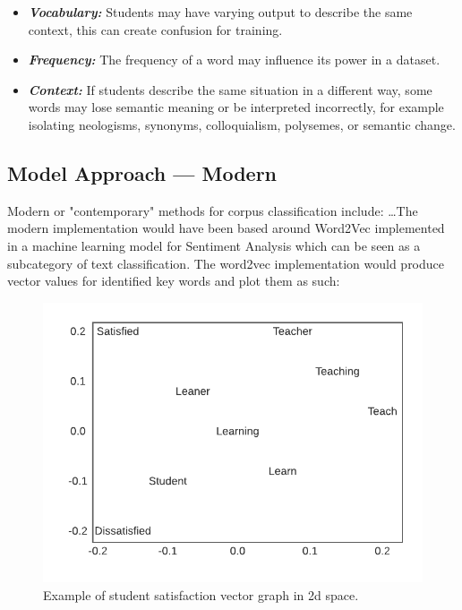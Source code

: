 \begin{itemize}
    \item \textbf{\textit{Vocabulary:}} Students may have varying output to describe the same context, this can create confusion for training.
    \item \textbf{\textit{Frequency:}} The frequency of a word may influence its power in a dataset.
    \item \textbf{\textit{Context:}} If students describe the same situation in a different way, some words may lose semantic meaning or be interpreted incorrectly, for example isolating neologisms, synonyms, colloquialism, polysemes, or semantic change.
\end{itemize}

\subsection{Model Approach --- Modern}

Modern or "contemporary" methods for corpus classification include: \ldots The modern implementation would have been based around Word2Vec implemented in a machine learning model for Sentiment Analysis which can be seen as a subcategory of text classification. The word2vec implementation would produce vector values for identified key words and plot them as such:

\begin{figure}[H]
    \centering
    \includegraphics[width=\textwidth]{figures/chapter-5/Example-Word-Vector.pdf}
    \caption[ExampleWordVector]{Example of student satisfaction vector graph in 2d space.
    \label{fig:Example-Word-Vector}}
\end{figure}

